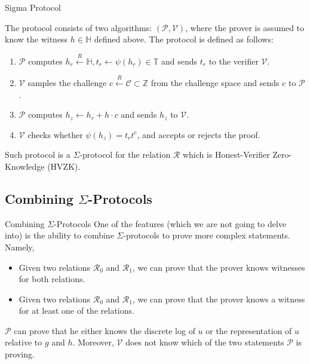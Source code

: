 \documentclass[xcolor={usenames,dvipsnames}]{beamer}
\begin{document}
    \begin{frame}{Sigma Protocol}
        \begin{definition}
            The protocol consists of two algorithms: $(\mathcal{P}, \mathcal{V})$, where the prover is assumed to know the witness $h \in \mathbb{H}$ defined above. The protocol is defined as follows:
            \begin{enumerate}
                \item $\mathcal{P}$ computes $h_r \xleftarrow{R} \mathbb{H}, t_r \gets \psi(h_r) \in \mathbb{T}$ and sends $t_r$ to the verifier $\mathcal{V}$.
                \item $\mathcal{V}$ samples the challenge $c \xleftarrow{R} \mathcal{C} \subset \mathbb{Z}$ from the challenge space and sends $c$ to $\mathcal{P}$.
                \item $\mathcal{P}$ computes $h_z \gets h_r + h\cdot c$ and sends $h_z$ to $\mathcal{V}$.
                \item $\mathcal{V}$ checks whether $\psi(h_z) = t_r t^c$, and accepts or rejects the proof.
            \end{enumerate}
        \end{definition}

        \begin{theorem}
            Such protocol is a $\Sigma$-protocol for the relation $\mathcal{R}$ which is Honest-Verifier Zero-Knowledge (HVZK).
        \end{theorem}
    \end{frame}

    \subsection{Combining $\Sigma$-Protocols}

    \begin{frame}{Combining $\Sigma$-Protocols}
        One of the features (which we are not going to delve into) is the ability to combine $\Sigma$-protocols to prove more complex statements. Namely,
        \begin{itemize}
            \item Given two relations $\mathcal{R}_0$ and $\mathcal{R}_1$, we can prove that the prover knows witnesses for both relations.
            \item Given two relations $\mathcal{R}_0$ and $\mathcal{R}_1$, we can prove that the prover knows a witness for at least one of the relations.
        \end{itemize}

        \begin{example}
            $\mathcal{P}$ can prove that he either knows the discrete log of $u$ or the representation of $u$ relative to $g$ and $h$. Moreover, $\mathcal{V}$ does not know which of the two statements $\mathcal{P}$ is proving.
        \end{example}
    \end{frame}
\end{document}
